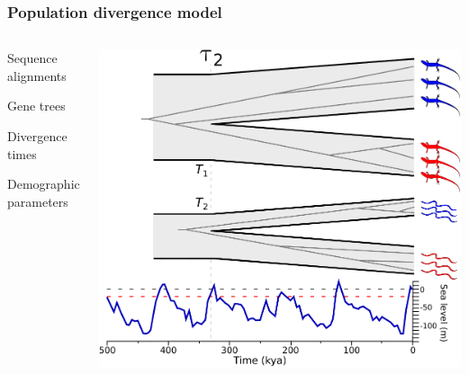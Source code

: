 \begin{frame}
    \frametitle{Population divergence model}
    \begin{columns}[c]
            \begin{mydescription}
                \item<1->[\alignmentVector] Sequence alignments
                \item<1->[\geneTreeVector] Gene trees
                \item<1->[\divTimeMapVector] Divergence times
                \item<1->[\demographicParamVector] Demographic parameters
            \end{mydescription}
            \includegraphics[width=\textwidth]{../images/sea-level-species-trees-gene-trees.pdf}
    \end{columns}
\end{frame}



